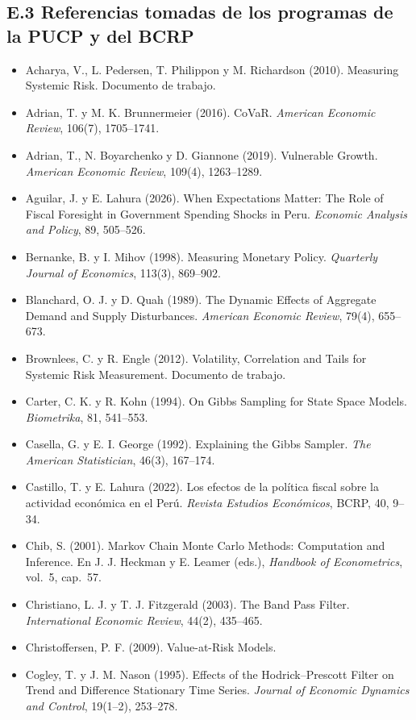\documentclass[11pt,a4paper]{article}
\begin{document}
\subsection*{E.3 Referencias tomadas de los programas de la PUCP y del BCRP}
{\small
\begin{itemize}[leftmargin=1.4em,itemsep=1pt,label={}]
\item Acharya, V., L. Pedersen, T. Philippon y M. Richardson (2010). Measuring Systemic Risk. Documento de trabajo.
\item Adrian, T. y M. K. Brunnermeier (2016). CoVaR. \emph{American Economic Review}, 106(7), 1705--1741.
\item Adrian, T., N. Boyarchenko y D. Giannone (2019). Vulnerable Growth. \emph{American Economic Review}, 109(4), 1263--1289.
\item Aguilar, J. y E. Lahura (2026). When Expectations Matter: The Role of Fiscal Foresight in Government Spending Shocks in Peru. \emph{Economic Analysis and Policy}, 89, 505--526.
\item Bernanke, B. y I. Mihov (1998). Measuring Monetary Policy. \emph{Quarterly Journal of Economics}, 113(3), 869--902.
\item Blanchard, O. J. y D. Quah (1989). The Dynamic Effects of Aggregate Demand and Supply Disturbances. \emph{American Economic Review}, 79(4), 655--673.
\item Brownlees, C. y R. Engle (2012). Volatility, Correlation and Tails for Systemic Risk Measurement. Documento de trabajo.
\item Carter, C. K. y R. Kohn (1994). On Gibbs Sampling for State Space Models. \emph{Biometrika}, 81, 541--553.
\item Casella, G. y E. I. George (1992). Explaining the Gibbs Sampler. \emph{The American Statistician}, 46(3), 167--174.
\item Castillo, T. y E. Lahura (2022). Los efectos de la política fiscal sobre la actividad económica en el Perú. \emph{Revista Estudios Económicos}, BCRP, 40, 9--34.
\item Chib, S. (2001). Markov Chain Monte Carlo Methods: Computation and Inference. En J. J. Heckman y E. Leamer (eds.), \emph{Handbook of Econometrics}, vol.~5, cap.~57.
\item Christiano, L. J. y T. J. Fitzgerald (2003). The Band Pass Filter. \emph{International Economic Review}, 44(2), 435--465.
\item Christoffersen, P. F. (2009). Value-at-Risk Models.
\item Cogley, T. y J. M. Nason (1995). Effects of the Hodrick--Prescott Filter on Trend and Difference Stationary Time Series. \emph{Journal of Economic Dynamics and Control}, 19(1--2), 253--278.

\end{itemize}}
\end{document}
